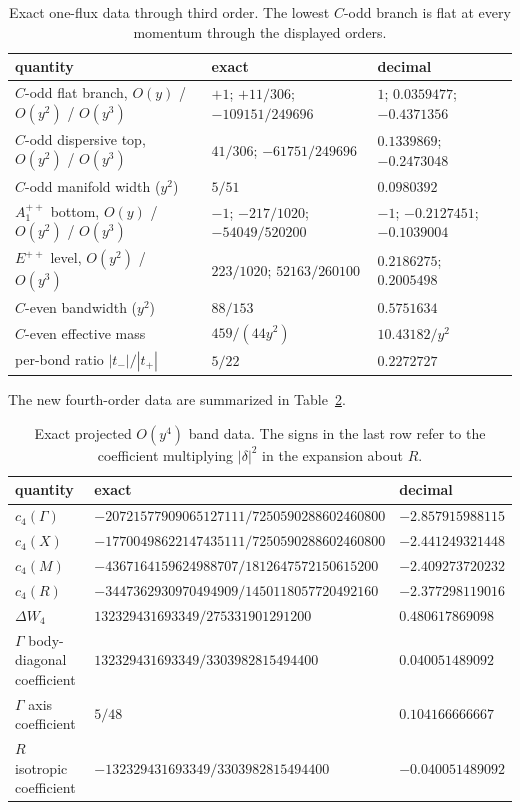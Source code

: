 \documentclass[11pt]{article}
\begin{document}
\begin{table}[ht]
\centering
\scriptsize
\begin{tabular}{lll}
\toprule
quantity & exact & decimal \\
\midrule
$C$-odd flat branch, $O(y)$ / $O(y^2)$ / $O(y^3)$ &
$+1$; $+11/306$; $-109151/249696$ &
$1$; $0.0359477$; $-0.4371356$ \\
$C$-odd dispersive top, $O(y^2)$ / $O(y^3)$ &
$41/306$; $-61751/249696$ & $0.1339869$; $-0.2473048$ \\
$C$-odd manifold width ($y^2$) & $5/51$ & $0.0980392$ \\
$A_1^{++}$ bottom, $O(y)$ / $O(y^2)$ / $O(y^3)$ &
$-1$; $-217/1020$; $-54049/520200$ &
$-1$; $-0.2127451$; $-0.1039004$ \\
$E^{++}$ level, $O(y^2)$ / $O(y^3)$ &
$223/1020$; $52163/260100$ & $0.2186275$; $0.2005498$ \\
$C$-even bandwidth ($y^2$) & $88/153$ & $0.5751634$ \\
$C$-even effective mass & $459/(44y^2)$ & $10.43182/y^2$ \\
per-bond ratio $|t_-|/|t_+|$ & $5/22$ & $0.2272727$ \\
\bottomrule
\end{tabular}
\caption{Exact one-flux data through third order. The lowest $C$-odd branch
is flat at every momentum through the displayed orders.}
\label{tab:lowerbands}
\end{table}

The new fourth-order data are summarized in Table~\ref{tab:y4band}.

\begin{table}[ht]
\centering
\scriptsize
\begin{tabular}{lll}
\toprule
quantity & exact & decimal \\
\midrule
$c_4(\Gamma)$ &
$-20721577909065127111/7250590288602460800$ & $-2.857915988115$ \\
$c_4(X)$ &
$-17700498622147435111/7250590288602460800$ & $-2.441249321448$ \\
$c_4(M)$ &
$-4367164159624988707/1812647572150615200$ & $-2.409273720232$ \\
$c_4(R)$ &
$-3447362930970494909/1450118057720492160$ & $-2.377298119016$ \\
$\Delta W_4$ &
$132329431693349/275331901291200$ & $0.480617869098$ \\
$\Gamma$ body-diagonal coefficient &
$132329431693349/3303982815494400$ & $0.040051489092$ \\
$\Gamma$ axis coefficient & $5/48$ & $0.104166666667$ \\
$R$ isotropic coefficient &
$-132329431693349/3303982815494400$ & $-0.040051489092$ \\
\bottomrule
\end{tabular}
\caption{Exact projected $O(y^4)$ band data. The signs in the last row refer
to the coefficient multiplying $|\delta|^2$ in the expansion about $R$.}
\label{tab:y4band}
\end{table}
\end{document}
